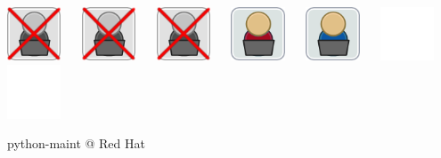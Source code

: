 \documentclass[1610,20pt]{beamer}
\newcommand\sk{\par\bigskip\bigskip\par}
\begin{document}
\begin{center}
\begin{frame}[fragile]
    \includegraphics[width=0.12\textwidth]{Join_OSDeveloper-x} ~~
    \includegraphics[width=0.12\textwidth]{Join_OSDeveloper-x} ~~
    \includegraphics[width=0.12\textwidth]{Join_OSDeveloper-x} ~~ 
    \includegraphics[width=0.12\textwidth]{Join_OSDeveloper-me} ~~
    \includegraphics[width=0.12\textwidth]{Join_OSDeveloper} ~~
    \includegraphics[width=0.12\textwidth]{Join_OSDeveloper-no} ~~
    \includegraphics[width=0.12\textwidth]{Join_OSDeveloper-no}
\end{frame}

\begin{frame}[fragile]
    python-maint @ Red Hat
    \sk


\end{frame}
\end{center}
\end{document}
